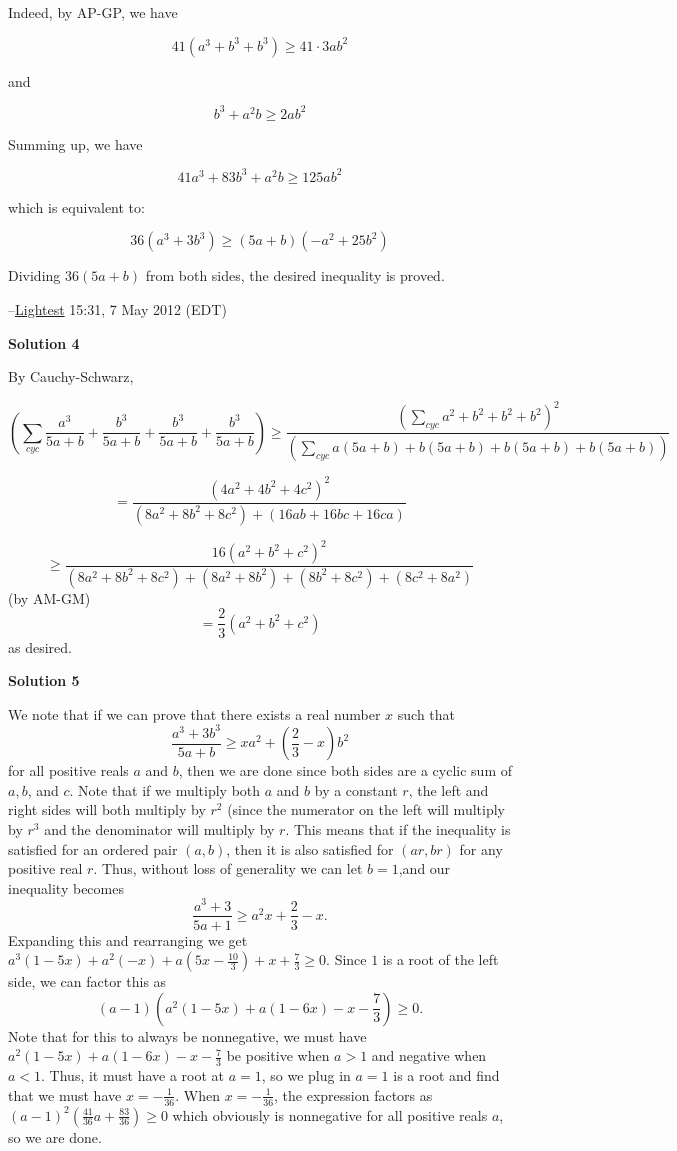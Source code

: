 \begin{enumerate}
 Indeed, by AP-GP, we have 

 
 \[41 (a^3 + b^3+b^3) \ge 41 \cdot 3 ab^2\]

 and

 
 \[b^3 + a^2b \ge 2 ab^2\]

 Summing up, we have

 
 \[41a^3 + 83b^3 + a^2 b \ge 125 ab^2\]

 which is equivalent to:

 
 \[36(a^3 + 3b^3) \ge (5a + b)(-a^2 + 25b^2)\]

 Dividing $36(5a+b)$ from both sides, the desired inequality is proved.

 --\href{https://artofproblemsolving.com/wiki/index.php?title=User:Lightest}{Lightest} 15:31, 7 May 2012 (EDT)

 



\textbf{Solution 4}

By Cauchy-Schwarz, 

 
 \[\left(\sum_{cyc} \dfrac{a^3}{5a + b} + \dfrac{b^3}{5a + b} + \dfrac{b^3}{5a + b} + \dfrac{b^3}{5a + b} \right) \ge \dfrac{\left( \sum_{cyc} a^2 + b^2 + b^2 + b^2 \right)^2}{ \left( \sum_{cyc} a(5a + b) + b(5a + b) + b(5a + b) + b(5a + b) \right) }\]

 \[= \dfrac{\left(4a^2 + 4b^2 + 4c^2\right)^2}{\left(8a^2 + 8b^2 + 8c^2\right) + \left(16ab + 16bc + 16ca\right)}\]

 \[\ge \dfrac{16\left(a^2 + b^2 + c^2\right)^2}{\left(8a^2 + 8b^2 + 8c^2\right) + \left(8a^2 + 8b^2\right) + \left(8b^2 + 8c^2\right) + \left(8c^2 + 8a^2\right)}\] (by AM-GM) 
 \[= \dfrac{2}{3}\left(a^2 + b^2 + c^2\right)\] as desired.

 



\textbf{Solution 5}

We note that if we can prove that there exists a real number $x$ such that 
 \[\frac{a^3+3b^3}{5a+b}\geq xa^2+(\frac{2}{3}-x)b^2\] for all positive reals $a$ and $b$, then we are done since both sides are a cyclic sum of $a,b$, and $c$. Note that if we multiply both $a$ and $b$ by a constant $r$, the left and right sides will both multiply by $r^2$ (since the numerator on the left will multiply by $r^3$ and the denominator will multiply by $r$. This means that if the inequality is satisfied for an ordered pair $(a,b)$, then it is also satisfied for $(ar,br)$ for any positive real $r$. Thus, without loss of generality we can let $b=1$,and our inequality becomes 
 \[\frac{a^3+3}{5a+1}\geq a^2x+\frac{2}{3}-x.\] Expanding this and rearranging we get $a^3(1-5x)+a^2(-x)+a(5x-\frac{10}{3})+x+\frac{7}{3}\geq0$. Since $1$ is a root of the left side, we can factor this as 
 \[(a-1)(a^2(1-5x)+a(1-6x)-x-\frac{7}{3})\geq0.\] Note that for this to always be nonnegative, we must have $a^2(1-5x)+a(1-6x)-x-\frac{7}{3}$ be positive when $a>1$ and negative when $a<1$. Thus, it must have a root at $a=1$, so we plug in $a=1$ is a root and find that we must have $x=-\frac{1}{36}$. When $x=-\frac{1}{36}$, the expression factors as $(a-1)^2(\frac{41}{36}a+\frac{83}{36})\geq0$ which obviously is nonnegative for all positive reals $a$, so we are done.


\end{enumerate}
